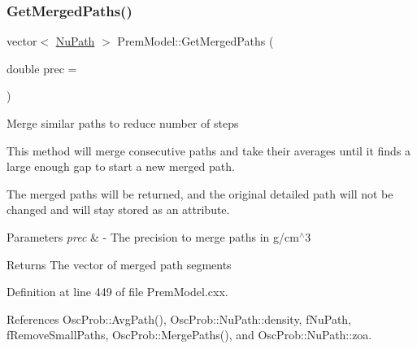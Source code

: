 \subsubsection{\texorpdfstring{Get\+Merged\+Paths()}{GetMergedPaths()}}
{\footnotesize\ttfamily vector$<$ \hyperlink{structOscProb_1_1NuPath}{Nu\+Path} $>$ Prem\+Model\+::\+Get\+Merged\+Paths (\begin{DoxyParamCaption}\item[{double}]{prec = {} }\end{DoxyParamCaption})\hspace{0.3cm}{\ttfamily [virtual]}}

Merge similar paths to reduce number of steps

This method will merge consecutive paths and take their averages until it finds a large enough gap to start a new merged path.

The merged paths will be returned, and the original detailed path will not be changed and will stay stored as an attribute.


\begin{DoxyParams}{Parameters}
{\em prec} & -\/ The precision to merge paths in g/cm$^\wedge$3 \\
\hline
\end{DoxyParams}
\begin{DoxyReturn}{Returns}
The vector of merged path segments 
\end{DoxyReturn}


Definition at line 449 of file Prem\+Model.\+cxx.



References Osc\+Prob\+::\+Avg\+Path(), Osc\+Prob\+::\+Nu\+Path\+::density, f\+Nu\+Path, f\+Remove\+Small\+Paths, Osc\+Prob\+::\+Merge\+Paths(), and Osc\+Prob\+::\+Nu\+Path\+::zoa.


